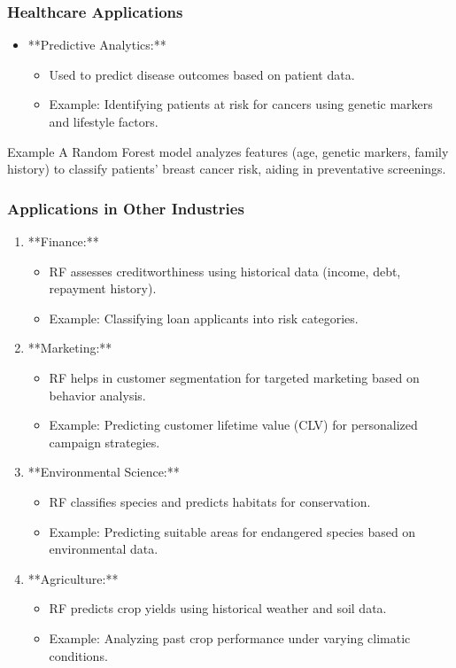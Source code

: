 \documentclass[aspectratio=169]{beamer}
\begin{document}
\begin{frame}[fragile]
    \frametitle{Healthcare Applications}
    \begin{itemize}
        \item **Predictive Analytics:**
        \begin{itemize}
            \item Used to predict disease outcomes based on patient data.
            \item Example: Identifying patients at risk for cancers using genetic markers and lifestyle factors.
        \end{itemize}
    \end{itemize}
    \begin{block}{Example}
        A Random Forest model analyzes features (age, genetic markers, family history) to classify patients' breast cancer risk, aiding in preventative screenings.
    \end{block}
\end{frame}

\begin{frame}[fragile]
    \frametitle{Applications in Other Industries}
    \begin{enumerate}
        \item **Finance:**
        \begin{itemize}
            \item RF assesses creditworthiness using historical data (income, debt, repayment history).
            \item Example: Classifying loan applicants into risk categories.
        \end{itemize}

        \item **Marketing:**
        \begin{itemize}
            \item RF helps in customer segmentation for targeted marketing based on behavior analysis.
            \item Example: Predicting customer lifetime value (CLV) for personalized campaign strategies.
        \end{itemize}

        \item **Environmental Science:**
        \begin{itemize}
            \item RF classifies species and predicts habitats for conservation.
            \item Example: Predicting suitable areas for endangered species based on environmental data.
        \end{itemize}

        \item **Agriculture:**
        \begin{itemize}
            \item RF predicts crop yields using historical weather and soil data.
            \item Example: Analyzing past crop performance under varying climatic conditions.
        \end{itemize}
    \end{enumerate}
\end{frame}
\end{document}
